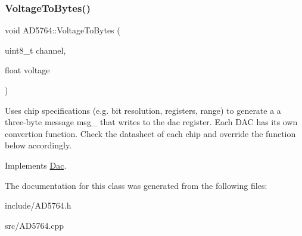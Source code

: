 \subsubsection{\texorpdfstring{Voltage\+To\+Bytes()}{VoltageToBytes()}}
{\footnotesize\ttfamily void A\+D5764\+::\+Voltage\+To\+Bytes (\begin{DoxyParamCaption}\item[{uint8\+\_\+t}]{channel,  }\item[{float}]{voltage }\end{DoxyParamCaption})\hspace{0.3cm}{\ttfamily [virtual]}}

Uses chip specifications (e.\+g. bit resolution, registers, range) to generate a a three-\/byte message msg\+\_\+ that writes to the dac register. Each D\+AC has its own convertion function. Check the datasheet of each chip and override the function below accordingly. 

Implements \mbox{\hyperlink{classDac_af5e882c87d38e1580d1b046ffd9effa0}{Dac}}.



The documentation for this class was generated from the following files\+:\begin{DoxyCompactItemize}
\item 
include/A\+D5764.\+h\item 
src/A\+D5764.\+cpp\end{DoxyCompactItemize}
